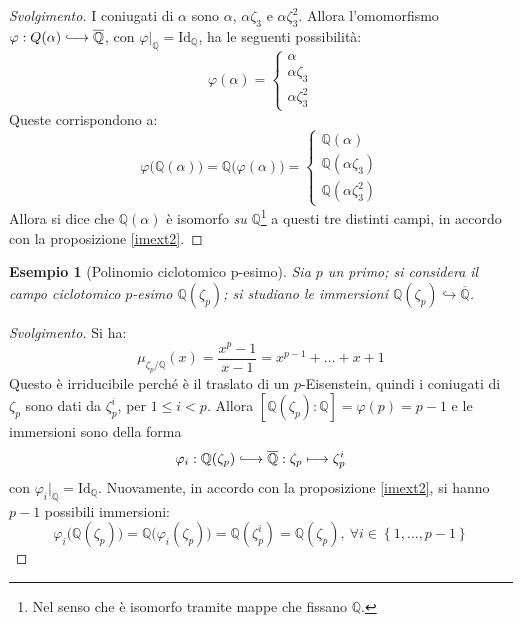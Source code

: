 \documentclass[12pt]{scrartcl}
\theoremstyle{style}
\newtheorem{esempio}{Esempio}[section]
\newenvironment{svolgimento}{\renewcommand\qedsymbol{$\blacksquare$}\begin{proof}[Svolgimento]}{\end{proof}}
\numberwithin{equation}{subsection}
\newcommand{\longhookrightarrow}{\lhook\joinrel\longrightarrow}
\begin{document}
\begin{svolgimento}
	I coniugati di $\alpha $ sono $\alpha$, $\alpha \zeta_3$ e $\alpha \zeta_3^2$.
	Allora l'omomorfismo $\varphi :Q(\alpha ) \longhookrightarrow \overline{\mathbb{Q}}$, con $\varphi |_{\mathbb{Q}}= \mathrm{Id} _{\mathbb{Q}}$, ha le seguenti possibilit\`a:
	\[
	\varphi (\alpha ) = \begin{cases}
		\alpha \\
		\alpha \zeta_3\\
		\alpha \zeta_3^2
	\end{cases}
	\] 
	Queste corrispondono a:
\[
\varphi \big(\mathbb{Q}(\alpha )\big) = \mathbb{Q}\big(\varphi (\alpha )\big) = \begin{cases}
	\mathbb{Q}(\alpha )\\
	\mathbb{Q}(\alpha \zeta_3)\\
	\mathbb{Q}(\alpha \zeta_3^2)
\end{cases}
\] 
Allora si dice che $\mathbb{Q}(\alpha )$ \`e isomorfo \textit{su} $\mathbb{Q}$\footnote{Nel senso che \`e isomorfo tramite mappe che fissano $\mathbb{Q}$.} a questi tre distinti campi, in accordo con la proposizione \ref{imext2}.
\end{svolgimento}
\begin{esempio}
	[Polinomio ciclotomico p-esimo]
	Sia $p$ un primo; si considera il campo ciclotomico $p$-esimo $\mathbb{Q}(\zeta_p)$; si studiano le immersioni $\mathbb{Q}(\zeta_p )\hookrightarrow \overline{\mathbb{Q}}$. 
\end{esempio}
\begin{svolgimento}
	Si ha:
	\[
	\mu _{\zeta_p / \mathbb{Q}} (x) = \frac{x^p - 1}{x-1} = x^{p-1}+\ldots+ x+1
	\] 
	Questo \`e irriducibile perch\'e \`e il traslato di un $p$-Eisenstein, quindi i coniugati di $\zeta_p$ sono dati da $\zeta_p^i$, per $1\le i < p$.
	Allora $[\mathbb{Q}(\zeta_p) :\mathbb{Q}] = \varphi (p) = p-1$ e le immersioni sono della forma
	\[
	\varphi _i :\mathbb{Q}(\zeta_p) \longhookrightarrow \overline{\mathbb{Q}} : \zeta_p \longmapsto \zeta_p^i
	\] 
	con $\varphi _i|_{\mathbb{Q}} = \mathrm{Id} _{\mathbb{Q}}$.
Nuovamente, in accordo con la proposizione \ref{imext2}, si hanno $p-1$ possibili immersioni:
\[
\varphi _i\big(\mathbb{Q}(\zeta_p)\big) = \mathbb{Q}\big(\varphi _i(\zeta_p)\big) = \mathbb{Q}(\zeta_p^i) = \mathbb{Q}(\zeta_p), \ \forall i \in \left\{ 1,\ldots,p-1 \right\} 
\] 
\end{svolgimento}
\end{document}
